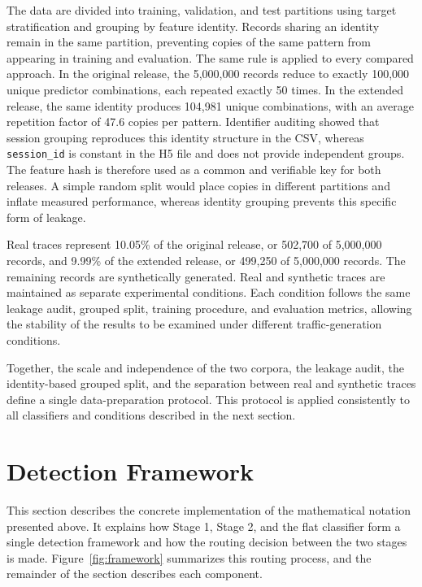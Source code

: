 \documentclass{IEEEoj}
\begin{document}
The data are divided into training, validation, and test partitions using
target stratification and grouping by feature identity. Records sharing an
identity remain in the same partition, preventing copies of the same pattern
from appearing in training and evaluation. The same rule is applied to every
compared approach. In the original release, the 5,000,000 records reduce to
exactly 100,000 unique predictor combinations, each repeated exactly 50 times.
In the extended release, the same identity produces 104,981 unique
combinations, with an average repetition factor of 47.6 copies per pattern.
Identifier auditing showed that session grouping reproduces this identity
structure in the CSV, whereas \texttt{session\_id} is constant in the H5 file
and does not provide independent groups. The feature hash is therefore used as
a common and verifiable key for both releases. A simple random split would
place copies in different partitions and inflate measured performance, whereas
identity grouping prevents this specific form of leakage.
\label{sec:splitting}

Real traces represent 10.05\% of the original release, or 502,700 of
5,000,000 records, and 9.99\% of the extended release, or 499,250 of
5,000,000 records. The remaining records are synthetically generated. Real
and synthetic traces are maintained as separate experimental conditions. Each
condition follows the same leakage audit, grouped split, training procedure,
and evaluation metrics, allowing the stability of the results to be examined
under different traffic-generation conditions.
\label{sec:real_synth}

Together, the scale and independence of the two corpora, the leakage audit,
the identity-based grouped split, and the separation between real and
synthetic traces define a single data-preparation protocol. This protocol is
applied consistently to all classifiers and conditions described in the next
section.
\section{Detection Framework}
This section describes the concrete implementation of the mathematical
notation presented above. It explains how Stage 1, Stage 2, and the flat
classifier form a single detection framework and how the routing decision
between the two stages is made. Figure~\ref{fig:framework} summarizes this
routing process, and the remainder of the section describes each component.
\end{document}
